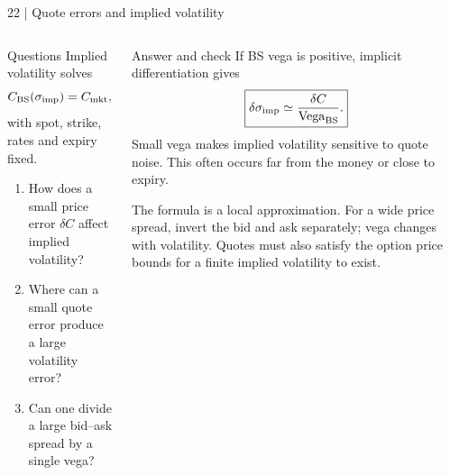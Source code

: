 \documentclass[handout,10pt,t,aspectratio=169]{beamer}
\newenvironment{questions}{\begin{block}{Questions}}{\end{block}}
\newenvironment{answers}{\begin{exampleblock}{Answer and check}}{\end{exampleblock}}
\newcommand{\compact}{\small%
 \setlength{\abovedisplayskip}{3pt}%
 \setlength{\belowdisplayskip}{3pt}%
 \setlength{\abovedisplayshortskip}{2pt}%
 \setlength{\belowdisplayshortskip}{2pt}%
 \setlength{\parskip}{2pt}}
\begin{document}
\begin{frame}{22 | Quote errors and implied volatility}
\compact
\begin{columns}[T,onlytextwidth]
\begin{questions}
Implied volatility solves
\[
 C_{\rm BS}(\sigma_{\rm imp})=C_{\rm mkt},
\]
with spot, strike, rates and expiry fixed.
\begin{enumerate}
\item How does a small price error \(\delta C\) affect implied volatility?
\item Where can a small quote error produce a large volatility error?
\item Can one divide a large bid--ask spread by a single vega?
\end{enumerate}
\end{questions}
\begin{answers}
If BS vega is positive, implicit differentiation gives
\[
 \boxed{\delta\sigma_{\rm imp}
 \simeq\frac{\delta C}{{\rm Vega}_{\rm BS}}.}
\]
Small vega makes implied volatility sensitive to quote noise.
This often occurs far from the money or close to expiry.

The formula is a local approximation. For a wide price spread,
invert the bid and ask separately; vega changes with volatility.
Quotes must also satisfy the option price bounds for a finite implied
volatility to exist.
\end{answers}
\end{columns}
\end{frame}
\end{document}
